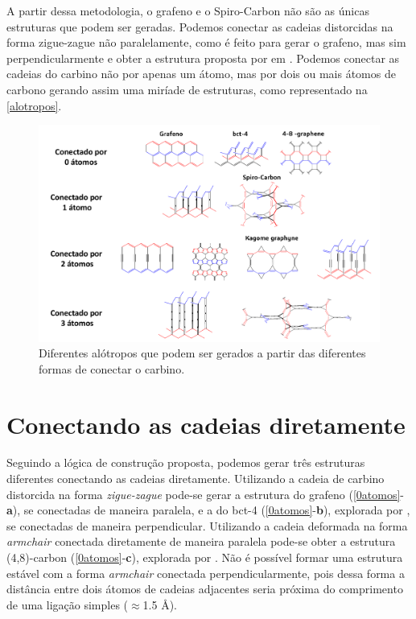 	A partir dessa metodologia, o grafeno e o Spiro-Carbon não são as únicas estruturas que podem ser geradas. Podemos conectar as cadeias distorcidas na forma zigue-zague não paralelamente, como é feito para gerar o grafeno, mas sim perpendicularmente e obter a estrutura proposta por \citeauthor{hoffmann1983hypothetical} em \citeyear{hoffmann1983hypothetical}. Podemos conectar as cadeias do carbino não por apenas um átomo, mas por dois ou mais átomos de carbono gerando assim uma miríade de estruturas, como representado na \autoref{alotropos}. 
	
	\begin{figure}[!ht]
		\centering
		\includegraphics[width=1.\linewidth]{capitulos/fig/results3/alotropos}
		\caption{Diferentes alótropos que podem ser gerados a partir das diferentes formas de conectar o carbino.}
		\label{alotropos}
	\end{figure}

	\section{Conectando as cadeias diretamente}
		
		Seguindo a lógica de construção proposta, podemos gerar três estruturas diferentes conectando as cadeias diretamente. Utilizando a cadeia de carbino distorcida na forma \textit{zigue-zague} pode-se gerar a estrutura do grafeno (\autoref{0atomos}-\textbf{a}), se conectadas de maneira paralela, e a do bct-4 (\autoref{0atomos}-\textbf{b}), explorada por \citeauthor{hoffmann1983hypothetical}, se conectadas de maneira perpendicular. Utilizando a cadeia deformada na forma \textit{armchair} conectada diretamente de maneira paralela pode-se obter a estrutura (4,8)-carbon (\autoref{0atomos}-\textbf{c}), explorada por \citeauthor{nisar2012semiconducting}. Não é possível formar uma estrutura estável com a forma \textit{armchair} conectada perpendicularmente, pois dessa forma a distância entre dois átomos de cadeias adjacentes seria próxima do comprimento de uma ligação simples ($\approx$1.5 Å). 
		
